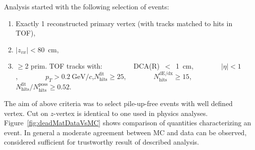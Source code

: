 Analysis started with the following selection of events:\vspace{-5pt}
\begin{enumerate}
 \item Exactly 1 reconstructed primary vertex (with tracks matched to hits in TOF),\vspace{-5pt}
 \item $|z_{vx}|<80$~cm\vspace{-5pt},
 \item $\geq$2 prim. TOF tracks with:~~~~~~~~~DCA(R)~$<$~1~cm,~~~~~~~~$|\eta|<1$,~~~~~~~~$p_{T}>0.2~\text{GeV}/c$,\newline\hspace*{150pt}$N_{\textrm{hits}}^{\textrm{fit}}\geq25$,~~~~~~~~$N_{\textrm{hits}}^{\textrm{dE/dx}}\geq15$,~~~~~~~~$N_{\textrm{hits}}^{\textrm{fit}}/N_{\textrm{hits}}^{\textrm{poss}}\geq0.52$.
\end{enumerate}%
The aim of above criteria was to select pile-up-free events with well defined vertex. Cut on $z$-vertex is identical to one used in physics analyses. Figure~\ref{fig:deadMatDataVsMC} shows comparison of quantities characterizing an event. In general a moderate agreement between MC and data can be observed, considered sufficient for trustworthy result of described analysis.
